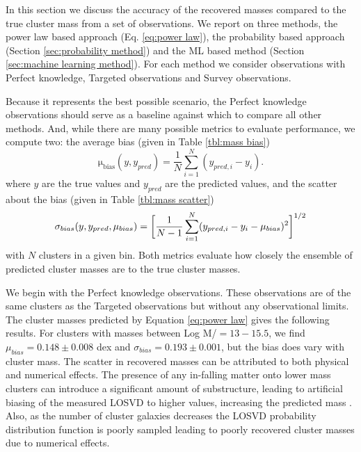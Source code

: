 \documentclass[fleqn,usenatbib]{mnras}
\begin{document}
In this section we discuss the accuracy of the recovered masses compared to the true cluster mass from a set of observations. We report on three methods, the power law based approach (Eq. \ref{eq:power law}), the probability based approach (Section \ref{sec:probability method}) and the ML based method (Section \ref{sec:machine learning method}). For each method we consider observations with Perfect knowledge, Targeted observations and Survey observations.

Because it represents the best possible scenario, the Perfect knowledge observations should serve as a baseline against which to compare all other methods. And, while there are many possible metrics to evaluate performance, we compute two: the average bias (given in Table \ref{tbl:mass bias})
\begin{equation}\label{eqn: bias}
\mathrm{\mu_{bias}}(y,y_{pred}) = \frac{1}{N} \sum_{i=1}^N (y_{pred,i} - y_i).
\end{equation}
where $y$ are the true values and $y_{pred}$ are the predicted values, and the scatter about the bias (given in Table \ref{tbl:mass scatter})
\begin{equation}\label{eqn: scatter}
	\sigma_{bias}(y,y_{pred}, \mu_{bias}) = \bigg{[}\frac{1}{N-1} \sum_{i=1}^N (y_{pred,i} - y_i - \mu_{bias})^2 \bigg{]}^{1/2}
\end{equation}
with $N$ clusters in a given bin. Both metrics evaluate how closely the ensemble of predicted cluster masses are to the true cluster masses.

We begin with the Perfect knowledge observations. These observations are of the same clusters as the Targeted observations but without any observational limits. The cluster masses predicted by Equation \ref{eq:power law} gives the following results. For clusters with masses between Log M/\Msol $= 13 - 15.5$, we find $\mu_{bias} = 0.148\pm{0.008}$ dex and $\sigma_{bias} = 0.193\pm{0.001}$, but the bias does vary with cluster mass. The scatter in recovered masses can be attributed to both physical and numerical effects. The presence of any in-falling matter onto lower mass clusters can introduce a significant amount of substructure, leading to artificial biasing of the measured LOSVD to higher values, increasing the predicted mass . Also, as the number of cluster galaxies decreases the LOSVD probability distribution function is poorly sampled leading to poorly recovered cluster masses due to numerical effects. 
\end{document}
